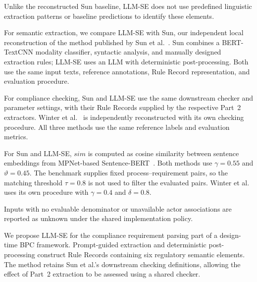Unlike the reconstructed Sun baseline, LLM-SE does not use predefined linguistic extraction patterns or baseline predictions to identify these elements.

For semantic extraction, we compare LLM-SE with Sun, our independent local reconstruction of the method published by Sun et al.~\cite{sun2024design}. Sun combines a BERT-TextCNN modality classifier, syntactic analysis, and manually designed extraction rules; LLM-SE uses an LLM with deterministic post-processing. Both use the same input texts, reference annotations, Rule Record representation, and evaluation procedure.

For compliance checking, Sun and LLM-SE use the same downstream checker and parameter settings, with their Rule Records supplied by the respective Part~2 extractors. Winter et al.~\cite{winter2020assessing} is independently reconstructed with its own checking procedure. All three methods use the same reference labels and evaluation metrics.

For Sun and LLM-SE, \(sim\) is computed as cosine similarity between sentence embeddings from MPNet-based Sentence-BERT~\cite{reimers2019sentence,song2020mpnet}. Both methods use \(\gamma=0.55\) and \(\vartheta=0.45\). The benchmark supplies fixed process--requirement pairs, so the matching threshold \(\tau=0.8\) is not used to filter the evaluated pairs. Winter et al. uses its own procedure with \(\gamma=0.4\) and \(\delta=0.8\).

Inputs with no evaluable denominator or unavailable actor associations are reported as unknown under the shared implementation policy.

We propose LLM-SE for the compliance requirement parsing part of a design-time BPC framework. Prompt-guided extraction and deterministic post-processing construct Rule Records containing six regulatory semantic elements. The method retains Sun et al.'s downstream checking definitions, allowing the effect of Part~2 extraction to be assessed using a shared checker.

